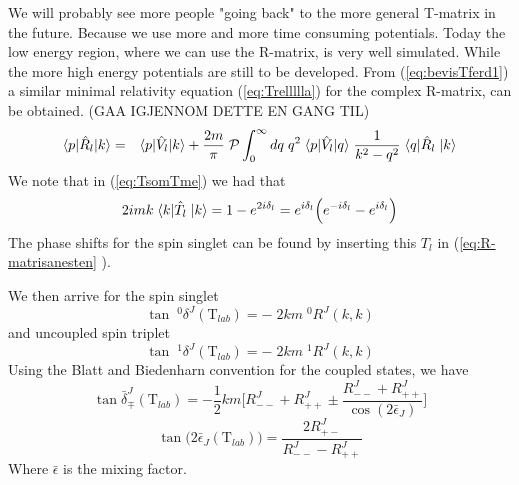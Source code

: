 We will probably see more people "going back" to the more general T-matrix in the future. 
Because we use more and more time consuming potentials. Today the low energy region, where we can use the R-matrix, 
is very well simulated. While the more high
energy potentials are still to be developed.\nl
%
From (\ref{eq:bevisTferd1}) a similar minimal relativity equation (\ref{eq:Trellllla}) for the complex R-matrix, can be obtained.
(GAA IGJENNOM DETTE EN GANG TIL)
\begin{eqnarray}\label{eq:Trelllllaheyiy}
\braketm{{ p}} {\op{R}_l}{{ k}}&=&\braketm{{ p}}{\op{V}_l}{{ k}}
+ \frac{2m}{\pi}\;{\cal P}\int^{\infty}_{0}d { q}\; q^2\;\bra{{ p}}\op{V}_l\ket{{ q}}
\;\inv{{ k^2}-{ q^2}}   \;\bra{{ q}} \op{R}_l\;\ket{{ k}}
\end{eqnarray}
We note that in (\ref{eq:TsomTme}) we had that
\begin{equation}
2imk\;\langle k|\hat{T}_{l}\;|{ k}\rangle=1-e^{2i\delta_l}=e^{i\delta_l}\Big(e^{-i\delta_l}-e^{i\delta_l}\Big)
\end{equation}
The phase shifts for the spin singlet can be found by inserting this $T_l$ in (\ref{eq:R-matrisanesten} ). 

We then arrive for the spin singlet
\begin{equation}\label{eq:deltasfasing}
\tan {\;}^0\delta^J(\textrm{T}_{lab})=-\;2km{\;}^0R^J(k,k)
\end{equation}
and uncoupled spin triplet
\begin{equation}\label{eq:deltasfatrip}
\tan {\;}^1\delta^J(\textrm{T}_{lab})=-\;2km{\;}^1R^J(k,k)
\end{equation}
Using the Blatt and Biedenharn convention for the coupled states, we have
\begin{equation}\label{eq:deltasfacob}
\tan \bar{\delta}^J_\mp(\textrm{T}_{lab})=-\frac{1}{2}km\bigg[R^J_{--}+R^J_{++}\pm\frac{R^J_{--}+R^J_{++}}
{\cos(2\bar{\epsilon}_J)}\bigg]
\end{equation}
\begin{equation}\label{eq:taneps}
\tan\bigg(2\bar{\epsilon}_J(\textrm{T}_{lab})\bigg)=\frac{2R^J_{+-}}{R^J_{--}-R^J_{++}}
\end{equation}
Where $\bar{\epsilon}$ is the mixing factor.














